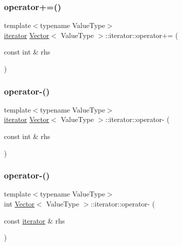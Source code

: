 \mbox{\label{classVector_1_1iterator_a3d235cc15e3d6f4c8ebcff1e08b7add8}} 
\subsubsection{\texorpdfstring{operator+=()}{operator+=()}}
{\footnotesize\ttfamily template$<$typename Value\+Type$>$ \\
\mbox{\hyperlink{classVector_1_1iterator}{iterator}} \mbox{\hyperlink{classVector}{Vector}}$<$ Value\+Type $>$\+::iterator\+::operator+= (\begin{DoxyParamCaption}\item[{const int \&}]{rhs }\end{DoxyParamCaption})\hspace{0.3cm}{\ttfamily [inline]}}

\mbox{\label{classVector_1_1iterator_ab45a48101ce148b2b762f1d0ff4f3794}} 
\subsubsection{\texorpdfstring{operator-\/()}{operator-()}\hspace{0.1cm}{\footnotesize\ttfamily [1/2]}}
{\footnotesize\ttfamily template$<$typename Value\+Type$>$ \\
\mbox{\hyperlink{classVector_1_1iterator}{iterator}} \mbox{\hyperlink{classVector}{Vector}}$<$ Value\+Type $>$\+::iterator\+::operator-\/ (\begin{DoxyParamCaption}\item[{const int \&}]{rhs }\end{DoxyParamCaption})\hspace{0.3cm}{\ttfamily [inline]}}

\mbox{\label{classVector_1_1iterator_a7a011ddf4b9d05e457e88e4d0a3b9e4f}} 
\subsubsection{\texorpdfstring{operator-\/()}{operator-()}\hspace{0.1cm}{\footnotesize\ttfamily [2/2]}}
{\footnotesize\ttfamily template$<$typename Value\+Type$>$ \\
int \mbox{\hyperlink{classVector}{Vector}}$<$ Value\+Type $>$\+::iterator\+::operator-\/ (\begin{DoxyParamCaption}\item[{const \mbox{\hyperlink{classVector_1_1iterator}{iterator}} \&}]{rhs }\end{DoxyParamCaption})\hspace{0.3cm}{\ttfamily [inline]}}

